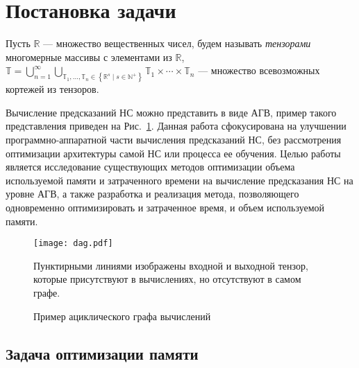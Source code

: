 \section{Постановка задачи}\label{sec:task}

Пусть $\mathbb{R}$ — множество вещественных чисел, будем называть
\textit{тензорами} многомерные массивы с элементами из $\mathbb{R}$, $\mathbb T
= \bigcup\limits_{n=1}^{\infty}\bigcup\limits_{\mathbb{T}_1,\ldots,\mathbb{T}_n
\in \left\{\mathbb{R}^{s} \mid s \in \mathbb{N}^{+}\right\}} \mathbb{T}_1 \times
\cdots \times \mathbb{T}_n$ — множество всевозможных кортежей из тензоров.


Вычисление предсказаний НС можно представить в виде АГВ, пример такого
представления приведен на Рис.~\ref{fig:cfg}. Данная работа сфокусирована на
улучшении программно-аппаратной части вычисления предсказаний НС, без
рассмотрения оптимизации архитектуры самой НС или процесса ее обучения. Целью
работы является исследование существующих методов оптимизации объема
используемой памяти и затраченного времени на вычисление предсказания НС на
уровне АГВ, а также разработка и реализация метода, позволяющего одновременно
оптимизировать и затраченное время, и объем используемой памяти.

\begin{figure}[h]
\centering
\texttt{[image: dag.pdf]}
\caption{Пример ациклического графа вычислений}
\label{fig:cfg}
Пунктирными линиями изображены входной и выходной тензор, которые присутствуют в
вычислениях, но отсутствуют в самом графе.
\end{figure}

\subsection{Задача оптимизации памяти}

